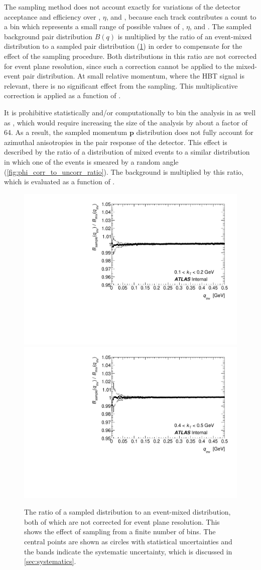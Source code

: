 The sampling method does not account exactly for variations of the detector acceptance and efficiency over \pt, $\eta$, and \kphi, because each track contributes a count to a bin which represents a small range of possible values of \pt, $\eta$, and \tdpk.
The sampled background pair distribution $B(q)$ is multiplied by the ratio of an event-mixed distribution to a sampled pair distribution (\cref{fig:sample_to_mix_ratio}) in order to compensate for the effect of the sampling procedure.
Both distributions in this ratio are not corrected for event plane resolution, since such a correction cannot be applied to the mixed-event pair distribution.
At small relative momentum, where the HBT signal is relevant, there is no significant effect from the sampling.
This multiplicative correction is applied as a function of \kt.

It is prohibitive statistically and/or computationally to bin the analysis in \psit as well as \tdpk, which would require increasing the size of the analysis by about a factor of 64. As a result, the sampled momentum $\mathbf{p}$ distribution does not fully account for azimuthal anisotropies in the pair response of the detector. This effect is described by the ratio of a distribution of mixed events to a similar distribution in which one of the events is smeared by a random angle (\cref{fig:phi_corr_to_uncorr_ratio}). The background is multiplied by this ratio, which is evaluated as a function of \kt.

\begin{figure}[t]
\centering
\includegraphics[width=.49\linewidth]{sample_to_mix_ratio_kt0.pdf}
\includegraphics[width=.49\linewidth]{sample_to_mix_ratio_kt3.pdf}\\
\caption{The ratio of a sampled distribution to an event-mixed distribution, both of which are not corrected for event plane resolution. This shows the effect of sampling from a finite number of bins. The central points are shown as circles with statistical uncertainties and the bands indicate the systematic uncertainty, which is discussed in \cref{sec:systematics}.}
\label{fig:sample_to_mix_ratio}
\end{figure}

